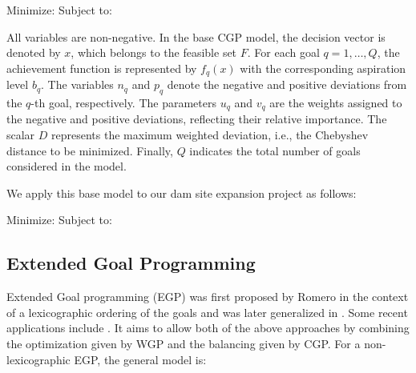 Minimize:
            \EqCGPMinFunctionSix
Subject to:
            \EqGGPMinFunctionSubTwo
            \EqCGPConstraintSeven
            \EqCGPConstraintEight
            \EqGGPMinFunctionSubFour
            \EqCGPConstraintNine

All variables are non-negative. In the base \gls{CGP} model, the decision vector is denoted by $x$, which belongs to the feasible set $F$. For each goal $q=1,\dots,Q$, the achievement function is represented by $f_q(x)$ with the corresponding aspiration level $b_q$. The variables $n_q$ and $p_q$ denote the negative and positive deviations from the $q$-th goal, respectively. The parameters $u_q$ and $v_q$ are the weights assigned to the negative and positive deviations, reflecting their relative importance. The scalar $D$ represents the maximum weighted deviation, i.e., the Chebyshev distance to be minimized. Finally, $Q$ indicates the total number of goals considered in the model.

We apply this base model to our dam site expansion project as follows:

Minimize:
            \EqCGPMinFunctionSix
Subject to:
            \EqDamHeightConstraintTwelve
            \EqDamCapacityConstraintThirteen
            \EqReservoirAreaConstraintFourteen
            \EqTemperatureConstraintFifteen
            \EqPopulationConstraintSixteen
            \EqRainfallConstraintSeventeen
            \EqResidenceConstraintEighteen
            \EqFarmlandDistanceConstraintNineteen
            \EqNearestRoadConstraintTwenty
            \EqFarmlandAreaConstraintTwentyOne
            \EqSelectThreeDamsTwentyTwo
            \EqBudgetConstraintTwentyThree
            \EqDConstraintOneNTwentyFour
            \EqDConstraintTwoNTwentyFive
            \EqDConstraintThreeNTwentySix
            \EqDConstraintFourNTwentySix
            \EqDConstraintFiveNTwentySeven
            \EqDConstraintSixNTwentyEight
            \EqDConstraintSevenNTwentyNine
            \EqDConstraintEightNThirty
            \EqDConstraintNineNThirtyOne
            \EqDConstraintTenNThirtyTwo

\subsection{Extended Goal Programming}  
Extended Goal programming (EGP) was first proposed by Romero \cite{ROMERO2001} in the context of a lexicographic ordering of the goals and was later generalized in \cite{ROMERO2004}. Some recent applications include \cite{Guijarro2018,Pal2014}. It aims to allow both of the above approaches by combining the optimization given by WGP and the balancing given by CGP. For a non-lexicographic EGP, the general model is:


